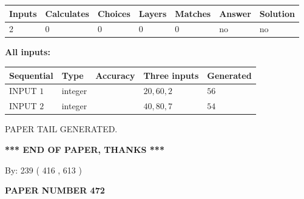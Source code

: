 \documentclass[12pt]{article}
\begin{document}
   
   
   
\noindent\begin{tabular}{|l|l|l|l|l|l|l|}
 \hline
Inputs & Calculates & Choices & Layers & Matches & Answer & Solution \\ \hline
 2  & 
 0  & 
 0
  & 
 0  & 
 0  & 
  no & 
  no 
  \\ \hline
 \end{tabular}
   
   
   
   
\noindent{}
   
   
   
   
\noindent\vspace{0.1in}\hspace{-0.08in} {\textbf{\Large{All inputs: }}}
   
   
  
  
\noindent\begin{tabular}{|l|l|l|l|l|}
\hline
 Sequential & Type & Accuracy & Three inputs & Generated \\ 
\hline
 
 
  INPUT $  1 $ & integer &  & $
 20
 , 
 60
 , 
 2
 $ & $ 56 $ 
 \\  \hline  
 
 
  INPUT $  2 $ & integer &  & $
 40
 , 
 80
 , 
 7
 $ & $ 54 $ 
 \\  \hline  
 \end{tabular}
   
   
   
   
   
   
 \vspace{0.2in}
 
   
   
\vspace{2.0in} PAPER TAIL GENERATED.
   
   
   
   
\vspace{1.0in} 
{\textbf{\large{ *** END OF PAPER, THANKS *** }}} 
   
   
\hspace{1.0in} By: 
 239 ( 416 ,  613 )
   
   
   
   
\newpage 
\setcounter{page}{ 
   472001 } 
   
   
   
   
 {\textbf{ \Large{ PAPER NUMBER  472  }}}
   
\end{document}
